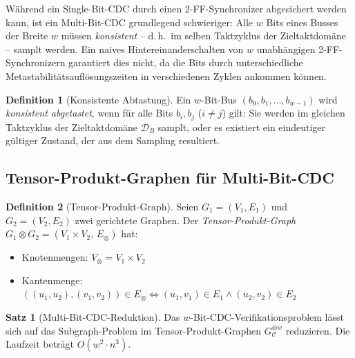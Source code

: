 ﻿\documentclass[a4paper,12pt]{article}
\theoremstyle{definition}
\newtheorem{definition}{Definition}
\newtheorem{satz}{Satz}
\begin{document}
	W\"ahrend ein Single-Bit-CDC durch einen 2-FF-Synchronizer abgesichert werden
	kann, ist ein Multi-Bit-CDC grundlegend schwieriger: Alle $w$ Bits eines Busses
	der Breite $w$ m\"ussen \emph{konsistent} -- d.\,h.\ im selben Taktzyklus der
	Zieltaktdom\"ane -- samplt werden. Ein naives Hintereinanderschalten von $w$
	unabh\"angigen 2-FF-Synchronizern garantiert dies nicht, da die Bits
	durch unterschiedliche Metastabilit\"atsaufl\"osungszeiten in verschiedenen
	Zyklen ankommen k\"onnen.
	
	\begin{definition}[Konsistente Abtastung]
		Ein $w$-Bit-Bus $(b_0, b_1, \ldots, b_{w-1})$ wird \emph{konsistent abgetastet},
		wenn f\"ur alle Bits $b_i, b_j$ ($i \neq j$) gilt: Sie werden im gleichen
		Taktzyklus der Zieltaktdom\"ane $\mathcal{D}_B$ samplt, oder es existiert
		ein eindeutiger g\"ultiger Zustand, der aus dem Sampling resultiert.
	\end{definition}
	
	\subsection{Tensor-Produkt-Graphen f\"ur Multi-Bit-CDC}
	
	\begin{definition}[Tensor-Produkt-Graph]
		Seien $G_1 = (V_1, E_1)$ und $G_2 = (V_2, E_2)$ zwei gerichtete Graphen.
		Der \emph{Tensor-Produkt-Graph} $G_1 \otimes G_2 = (V_1 \times V_2,\, E_\otimes)$
		hat:
		\begin{itemize}
			\item Knotenmengen: $V_\otimes = V_1 \times V_2$
			\item Kantenmenge: $((u_1, u_2), (v_1, v_2)) \in E_\otimes \Leftrightarrow
			(u_1, v_1) \in E_1 \wedge (u_2, v_2) \in E_2$
		\end{itemize}
	\end{definition}
	
	\begin{satz}[Multi-Bit-CDC-Reduktion]
		\label{satz:multibit}
		Das $w$-Bit-CDC-Verifikationsproblem l\"asst sich auf das
		Subgraph-Problem im Tensor-Produkt-Graphen $G_{\mathcal{C}}^{\otimes w}$
		reduzieren. Die Laufzeit betr\"agt $O(w^2 \cdot n^3)$.
	\end{satz}
	
\end{document}
